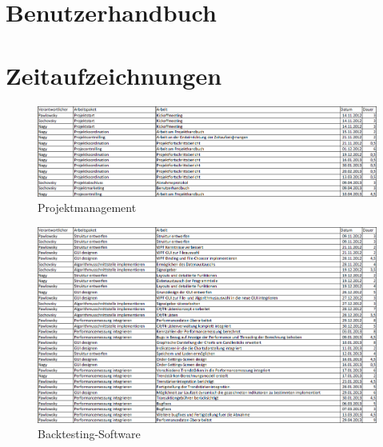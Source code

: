 \chapter{Benutzerhandbuch\label{appendix_A}}







\chapter{Zeitaufzeichnungen}

\begin{figure}
	\centering
		\includegraphics[width=1.2\textwidth, angle=90]{graphics/appendix/projektmanagement.PNG}
	\caption*{Projektmanagement}
\end{figure}

\begin{figure}
	\centering
		\includegraphics[width=1.2\textwidth, angle=90]{graphics/appendix/backtestingsoftware.PNG}
	\caption*{Backtesting-Software}
\end{figure}

